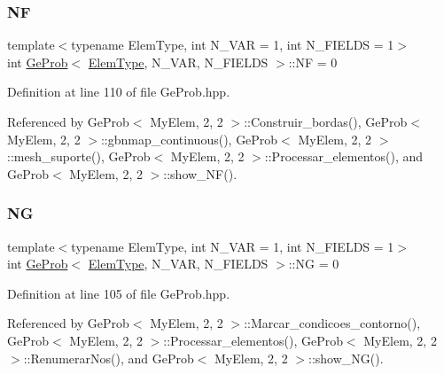 \mbox{\label{classGeProb_a4168b4f9002df61cb396728b9eecbdca}} 
\subsubsection{\texorpdfstring{NF}{NF}}
{\footnotesize\ttfamily template$<$typename Elem\+Type, int N\+\_\+\+V\+AR = 1, int N\+\_\+\+F\+I\+E\+L\+DS = 1$>$ \\
int \hyperlink{classGeProb}{Ge\+Prob}$<$ \hyperlink{spectral_8h_aaa2c1a7b2d1b12c590d730fe6ac839fa}{Elem\+Type}, N\+\_\+\+V\+AR, N\+\_\+\+F\+I\+E\+L\+DS $>$\+::NF = 0\hspace{0.3cm}{\ttfamily [protected]}}



Definition at line 110 of file Ge\+Prob.\+hpp.



Referenced by Ge\+Prob$<$ My\+Elem, 2, 2 $>$\+::\+Construir\+\_\+bordas(), Ge\+Prob$<$ My\+Elem, 2, 2 $>$\+::gbnmap\+\_\+continuous(), Ge\+Prob$<$ My\+Elem, 2, 2 $>$\+::mesh\+\_\+suporte(), Ge\+Prob$<$ My\+Elem, 2, 2 $>$\+::\+Processar\+\_\+elementos(), and Ge\+Prob$<$ My\+Elem, 2, 2 $>$\+::show\+\_\+\+N\+F().

\mbox{\label{classGeProb_ac9a59a8c31ccad50b7eabc436c365391}} 
\subsubsection{\texorpdfstring{NG}{NG}}
{\footnotesize\ttfamily template$<$typename Elem\+Type, int N\+\_\+\+V\+AR = 1, int N\+\_\+\+F\+I\+E\+L\+DS = 1$>$ \\
int \hyperlink{classGeProb}{Ge\+Prob}$<$ \hyperlink{spectral_8h_aaa2c1a7b2d1b12c590d730fe6ac839fa}{Elem\+Type}, N\+\_\+\+V\+AR, N\+\_\+\+F\+I\+E\+L\+DS $>$\+::NG = 0\hspace{0.3cm}{\ttfamily [protected]}}



Definition at line 105 of file Ge\+Prob.\+hpp.



Referenced by Ge\+Prob$<$ My\+Elem, 2, 2 $>$\+::\+Marcar\+\_\+condicoes\+\_\+contorno(), Ge\+Prob$<$ My\+Elem, 2, 2 $>$\+::\+Processar\+\_\+elementos(), Ge\+Prob$<$ My\+Elem, 2, 2 $>$\+::\+Renumerar\+Nos(), and Ge\+Prob$<$ My\+Elem, 2, 2 $>$\+::show\+\_\+\+N\+G().

